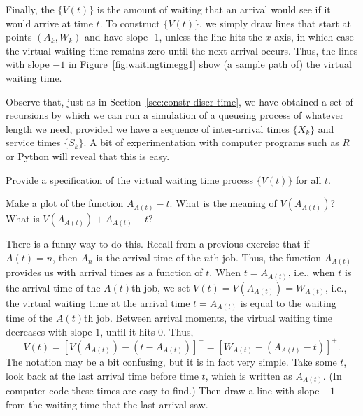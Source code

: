 Finally, the  $\{V(t)\}$ is the
amount of waiting that an arrival would see if it would arrive at time
$t$. To construct $\{V(t)\}$, we simply draw lines that start at
points $(A_k, W_k)$ and have slope -1, unless the line hits the
$x$-axis, in which case the virtual waiting time remains zero until
the next arrival occurs.  Thus, the lines with slope $-1$ in
Figure~\ref{fig:waitingtimegg1} show (a sample path of) the virtual
waiting time.


Observe that, just as in Section~\ref{sec:constr-discr-time}, we have
obtained a set of recursions by which we can run a simulation of a
queueing process of whatever length we need, provided we have a
sequence of inter-arrival times $\{X_k\}$ and service times
$\{S_k\}$.  A bit of experimentation with computer programs such as
$R$ or Python will reveal that this is easy.





\begin{exercise}
  Provide a specification of the virtual waiting time process $\{V(t)\}$ for
    all $t$.
    \begin{hint}Make a plot of the function $A_{A(t)}-t$. What is the meaning of $V(A_{A(t)})?$ What is
$V(A_{A(t)}) + A_{A(t)}-t$?
    \end{hint}
    \begin{solution}
      There is a funny way to do this. Recall from a previous exercise
      that if $A(t)=n$, then $A_n$ is the arrival time of the $n$th
      job. Thus, the function $A_{A(t)}$ provides us with arrival
      times as a function of $t$. When $t=A_{A(t)}$, i.e., when $t$ is
      the arrival time of the $A(t)$th job, we set
      $V(t) = V(A_{A(t)}) = W_{A(t)}$, i.e., the virtual waiting time
      at the arrival time $t=A_{A(t)}$ is equal to the waiting time of
      the $A(t)$th job. Between arrival moments, the virtual waiting
      time decreases with slope $1$, until it hits 0.  Thus,
      \begin{equation*}
        V(t) 
= [V(A_{A(t)}) - (t-A_{A(t)})]^+= [W_{A(t)} + (A_{A(t)}-t)]^+.
      \end{equation*}
      The notation may be a bit confusing, but it is in fact very
      simple. Take some $t$, look back at the last arrival time before
      time $t$, which is written as $A_{A(t)}$. (In computer code these
      times are easy to find.) Then draw a line with slope $-1$ from
      the waiting time that the last arrival saw.
    \end{solution}
\end{exercise}





